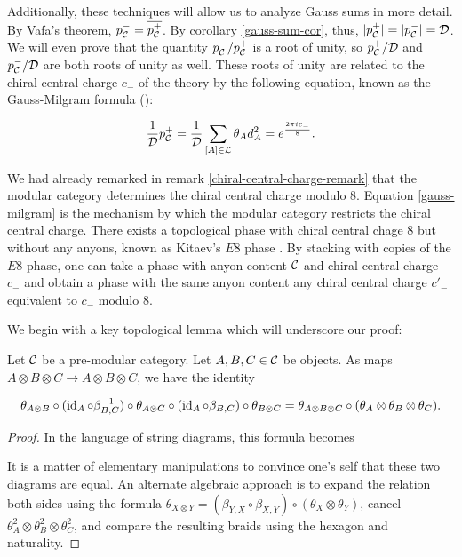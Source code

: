 Additionally, these techniques will allow us to analyze Gauss sums in more detail. By Vafa's theorem, $p_{{\mathcal C}}^{-}=\overline{p_{{\mathcal C}}^{+}}$. By corollary \ref{gauss-sum-cor}, thus, $|p_{{\mathcal C}}^+|=|p_{{\mathcal C}}^-|={\mathcal D}$. We will even prove that the quantity $p_{{\mathcal C}}^-/p_{{\mathcal C}}^+$ is a root of unity, so $p_{{\mathcal C}}^+/{\mathcal D}$ and $p_{{\mathcal C}}^-/{\mathcal D}$ are both roots of unity as well. These roots of unity are related to the chiral central charge $c_-$ of the theory by the following equation, known as the Gauss-Milgram formula (\cite{frohlich1990braid}):

\begin{equation}\label{gauss-milgram}
\frac{1}{{\mathcal D}}p_{{\mathcal C}}^{+}=\frac{1}{{\mathcal D}}\sum_{[A]\in {\mathcal L}}\theta_{A}d_A^2=e^{\frac{2\pi i c_-}{8}}.
\end{equation}

\begin{rem} We had already remarked in remark \ref{chiral-central-charge-remark} that the modular category determines the chiral central charge modulo $8$. Equation \ref{gauss-milgram} is the mechanism by which the modular category restricts the chiral central charge. There exists a topological phase with chiral central chage $8$ but without any anyons, known as Kitaev's $E8$ phase \cite{gaiotto2019symmetry}.  By stacking with copies of the $E8$ phase, one can take a phase with anyon content ${\mathcal C}$ and chiral central charge $c_-$ and obtain a phase with the same anyon content any chiral central charge $c'_-$ equivalent to $c_-$ modulo $8$.
\end{rem}


We begin with a key topological lemma which will underscore our proof:

\begin{lem}\label{lantern-identity} Let ${\mathcal C}$ be a pre-modular category. Let $A,B,C\in {\mathcal C}$ be objects. As maps $A\otimes B\otimes C \to A\otimes B \otimes C$, we have the identity

$$\theta_{A\otimes B}\circ (\operatorname{id}_A\circ \beta_{B,C}^{-1})\circ \theta_{A\otimes C}\circ (\operatorname{id}_{A}\circ \beta_{B,C})\circ \theta_{B\otimes C} = \theta_{A\otimes B\otimes C}\circ (\theta_{A}\otimes \theta_{B}\otimes \theta_{C}).$$
\end{lem}
\begin{proof} In the language of string diagrams, this formula becomes


It is a matter of elementary manipulations to convince one's self that these two diagrams are equal. An alternate algebraic approach is to expand the relation both sides using the formula $\theta_{X\otimes Y}=(\beta_{Y,X}\circ \beta_{X,Y})\circ (\theta_{X}\otimes \theta_{Y})$, cancel $\theta_{A}^2\otimes \theta_{B}^2\otimes \theta_{C}^2$, and compare the resulting braids using the hexagon and naturality.
\end{proof}

